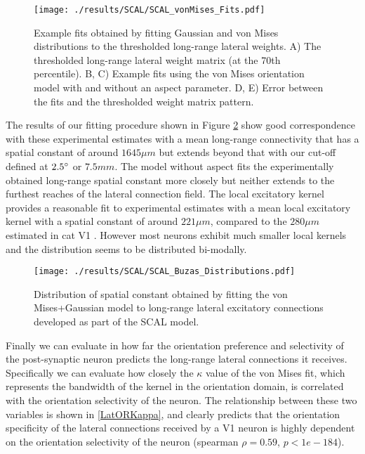 \begin{figure}
	\centering
        \texttt{[image: ./results/SCAL/SCAL\_vonMises\_Fits.pdf]}
	\caption[Combined Gaussian+vonMises model fits to lateral
      connectivity of the SCAL model.]{Example fits obtained by
      fitting Gaussian and von Mises distributions to the thresholded
      long-range lateral weights. A) The thresholded long-range
      lateral weight matrix (at the 70th percentile). B, C) Example
      fits using the von Mises orientation model with and without an
      aspect parameter. D, E) Error between the fits and the
      thresholded weight matrix pattern.}
	\label{LatFits}
\end{figure}

The results of our fitting procedure shown in Figure \ref{LatDist}
show good correspondence with these experimental estimates with a mean
long-range connectivity that has a spatial constant of around $1645 \mu m$
but extends beyond that with our cut-off defined at
$2.5\degree$ or $7.5 mm$. The model without aspect fits the
experimentally obtained long-range spatial constant more closely but
neither extends to the furthest reaches of the lateral connection
field. The local excitatory kernel provides a reasonable fit to
experimental estimates with a mean local excitatory kernel with a
spatial constant of around $221 \mu m$, compared to the $280 \mu m$
estimated in cat V1 \citep{Buzas2006}. However most neurons exhibit
much smaller local kernels and the distribution seems to be
distributed bi-modally.

\begin{figure}
	\centering
        \texttt{[image: ./results/SCAL/SCAL\_Buzas\_Distributions.pdf]}
	\caption[Distribution of spatial constants obtained by fitting
      Gaussian+vonMises model.]{Distribution of spatial constant
      obtained by fitting the \cite{Buzas2006} von Mises+Gaussian
      model to long-range lateral excitatory connections developed as
      part of the SCAL model.}
	\label{LatDist}
\end{figure}

Finally we can evaluate in how far the orientation preference and
selectivity of the post-synaptic neuron predicts the long-range
lateral connections it receives. Specifically we can evaluate how
closely the $\kappa$ value of the von Mises fit, which represents the
bandwidth of the kernel in the orientation domain, is correlated with
the orientation selectivity of the neuron. The relationship between
these two variables is shown in \ref{LatORKappa}, and clearly predicts
that the orientation specificity of the lateral connections received
by a V1 neuron is highly dependent on the orientation selectivity of
the neuron (spearman $\rho=0.59$, $p<1e-184$).

